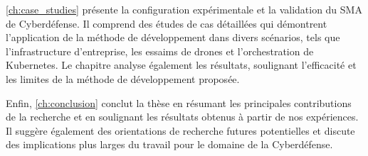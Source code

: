 \autoref{ch:case_studies} présente la configuration expérimentale et la validation du SMA de Cyberdéfense. Il comprend des études de cas détaillées qui démontrent l'application de la méthode de développement dans divers scénarios, tels que l'infrastructure d'entreprise, les essaims de drones et l'orchestration de Kubernetes. Le chapitre analyse également les résultats, soulignant l'efficacité et les limites de la méthode de développement proposée.

Enfin, \autoref{ch:conclusion} conclut la thèse en résumant les principales contributions de la recherche et en soulignant les résultats obtenus à partir de nos expériences. Il suggère également des orientations de recherche futures potentielles et discute des implications plus larges du travail pour le domaine de la Cyberdéfense.





